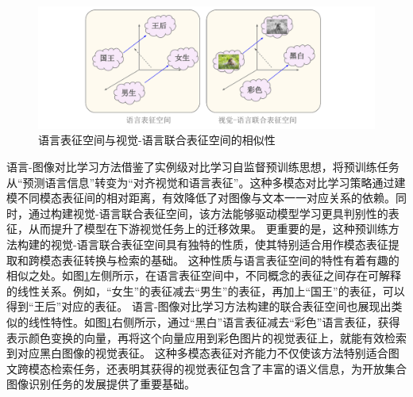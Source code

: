

\begin{figure}
  \centering
  \includegraphics[width=1.0\linewidth]{figures/论文-CLIP性质-v2.pdf}
  \caption{语言表征空间与视觉-语言联合表征空间的相似性}
  \label{fig:clip-word2vec}
\end{figure}

语言-图像对比学习方法\cite{radford2021learning,jia2021scaling,pham2023combined}借鉴了实例级对比学习自监督预训练思想，将预训练任务从“预测语言信息”转变为“对齐视觉和语言表征”。这种多模态对比学习策略通过建模不同模态表征间的相对距离，有效降低了对图像与文本一一对应关系的依赖。同时，通过构建视觉-语言联合表征空间，该方法能够驱动模型学习更具判别性的表征，从而提升了模型在下游视觉任务上的迁移效果。
更重要的是，这种预训练方法构建的视觉-语言联合表征空间具有独特的性质，使其特别适合用作模态表征提取和跨模态表征转换与检索的基础。
这种性质与语言表征空间\cite{word2vec,distword2vec}的特性有着有趣的相似之处。如图\ref{fig:clip-word2vec}左侧所示，在语言表征空间中，不同概念的表征之间存在可解释的线性关系。例如，“女生”的表征减去“男生”的表征，再加上“国王”的表征，可以得到“王后”对应的表征。
语言-图像对比学习方法构建的联合表征空间也展现出类似的线性特性。如图\ref{fig:clip-word2vec}右侧所示，通过“黑白”语言表征减去“彩色”语言表征，获得表示颜色变换的向量，再将这个向量应用到彩色图片的视觉表征上，就能有效检索到对应黑白图像的视觉表征。
这种多模态表征对齐能力不仅使该方法特别适合图文跨模态检索任务，还表明其获得的视觉表征包含了丰富的语义信息，为开放集合图像识别任务的发展提供了重要基础。

